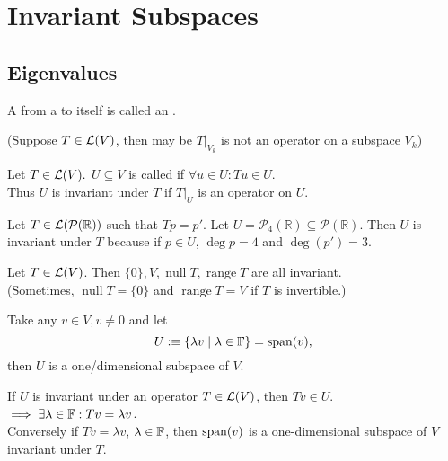 \section{Invariant Subspaces}

\subsection{Eigenvalues}

\begin{mydef} [operator]
  A \lm from a \vs to itself is called an .
\end{mydef}

(Suppose $T\in \mathcal{L}(V)$, then may be $\left.T\right|_{V_{k}}$ is not an operator on a subspace $V_k$)

\begin{mydef} 
  Let $T\in \mathcal{L}(V).$ $U \subseteq V$ is called  if $\forall u \in U: Tu \in U.$ \\
  Thus $U$ is invariant under $T$ if $\left.T\right|_{U}$ is an operator on $U.$
\end{mydef}

\begin{example}
  Let $T\in \mathcal{L}(\mathcal{P}(\mathbb{R}))$ such that $Tp=p'.$ Let $U=\mathcal{P}_4(\mathbb{R}) \subseteq \mathcal{P}(\mathbb{R}).$ Then $U$ is invariant under $T$
  because if $p \in U$, $\deg p = 4$ and $\deg (p')=3$.
\end{example}

\begin{example}
  Let $T\in \mathcal{L}(V)$. Then $\{0\}, V, \operatorname{null} T, \operatorname{range} T$ are all invariant. \\
  (Sometimes, $\operatorname{null} T = \{0\}$ and $\operatorname{range} T=V$ if $T$ is invertible.)
\end{example}


Take any $v\in V, v\neq 0$ and let
\begin{equation}
  U :\equiv \{  \lambda v \mid \lambda \in \mathbb{F} \} = \operatorname{span} (v),
\end{equation}
then $U$ is a one\-/dimensional subspace of $V$.

If $U$ is invariant under an operator $T \in \mathcal{L} (V)$, then $Tv  \in U$. $\implies \exists \lambda \in \mathbb{F}: Tv = \lambda v$. \\
Conversely if $Tv = \lambda v$, $\lambda \in \mathbb{F}$, then $\operatorname{span} (v)$ is a one-dimensional subspace of $V$ invariant under $T$.

